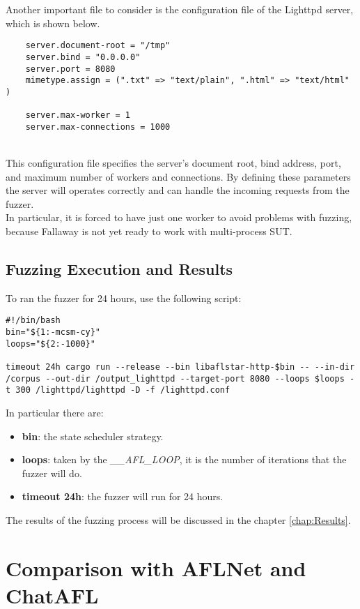 Another important file to consider is the configuration file of the Lighttpd server, which is shown below.\\
\begin{lstlisting}
    server.document-root = "/tmp"
    server.bind = "0.0.0.0"
    server.port = 8080
    mimetype.assign = (".txt" => "text/plain", ".html" => "text/html" )

    server.max-worker = 1 
    server.max-connections = 1000
\end{lstlisting}
\phantom{}\\
This configuration file specifies the server's document root, bind address, port, and maximum number of workers and connections. By defining these parameters the server will operates correctly and can handle the incoming requests from the fuzzer.
\\In particular, it is forced to have just one worker to avoid problems with fuzzing, because Fallaway is not yet ready to work with multi-process SUT.
\subsection{Fuzzing Execution and Results}

To ran the fuzzer for 24 hours, use the following script:

\begin{lstlisting}
#!/bin/bash
bin="${1:-mcsm-cy}"
loops="${2:-1000}"

timeout 24h cargo run --release --bin libaflstar-http-$bin -- --in-dir /corpus --out-dir /output_lighttpd --target-port 8080 --loops $loops -t 300 /lighttpd/lighttpd -D -f /lighttpd.conf
\end{lstlisting}
In particular there are:
\begin{itemize}
    \item \textbf{bin}: the state scheduler strategy.
    \item \textbf{loops}: taken by the \textit{\_\_AFL\_LOOP}, it is the number of iterations that the fuzzer will do.
    \item \textbf{timeout 24h}: the fuzzer will run for 24 hours.
\end{itemize}
The results of the fuzzing process will be discussed in the chapter \ref{chap:Results}.

\section{Comparison with AFLNet and ChatAFL}

